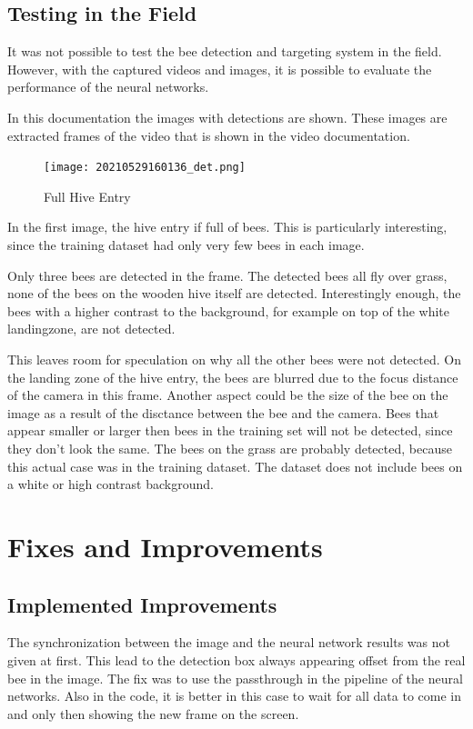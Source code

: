 \documentclass[a4paper,titlepage]{article}
\begin{document}
\subsection{Testing in the Field}

It was not possible to test the bee detection and targeting system in the field.
However, with the captured videos and images, it is possible to evaluate the performance of the neural networks.

In this documentation the images with detections are shown.
These images are extracted frames of the video that is shown in the video documentation.

\begin{figure}[H]
    \texttt{[image: 20210529160136\_det.png]}
    \caption{Full Hive Entry}
\end{figure}

In the first image, the hive entry if full of bees.
This is particularly interesting, since the training dataset had only very few bees in each image.

Only three bees are detected in the frame.
The detected bees all fly over grass, none of the bees on the wooden hive itself are detected.
Interestingly enough, the bees with a higher contrast to the background, for example on top of the white landingzone, are not detected.

This leaves room for speculation on why all the other bees were not detected.
On the landing zone of the hive entry, the bees are blurred due to the focus distance of the camera in this frame.
Another aspect could be the size of the bee on the image as a result of the disctance between the bee and the camera.
Bees that appear smaller or larger then bees in the training set will not be detected, since they don't look the same.
The bees on the grass are probably detected, because this actual case was in the training dataset.
The dataset does not include bees on a white or high contrast background.

\newpage
\section{Fixes and Improvements}

\subsection{Implemented Improvements}

The synchronization between the image and the neural network results was not given at first.
This lead to the detection box always appearing offset from the real bee in the image.
The fix was to use the passthrough in the pipeline of the neural networks.
Also in the code, it is better in this case to wait for all data to come in and only then showing the new frame on the screen.
\end{document}
